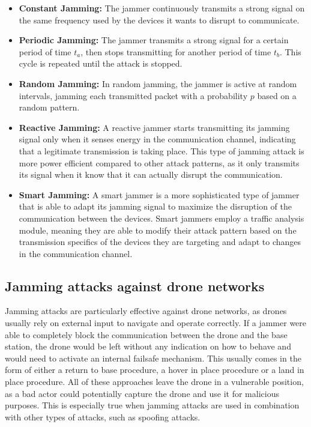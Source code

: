 \documentclass[futureinternet,article,submit,pdftex,moreauthors]{Definitions/mdpi}
\begin{document}
\begin{itemize}
    \item \textbf{Constant Jamming:} The jammer continuously transmits a strong signal on the same frequency used by the devices it wants to disrupt to communicate. 
    \item \textbf{Periodic Jamming:} The jammer transmits a strong signal for a certain period of time \(t_a\), then stops transmitting for another period of time \(t_b\). This cycle is repeated until the attack is stopped.
    \item \textbf{Random Jamming:} In random jamming, the jammer is active at random intervals, jamming each transmitted packet with a probability 
    \(p\) based on a random pattern\cite{VANETsAI-Lyamin}. 
    \item \textbf{Reactive Jamming:} A reactive jammer starts transmitting its jamming signal only when it senses energy in the communication channel, 
    indicating that a legitimate transmission is taking place. This type of jamming attack is more power efficient compared to other 
    attack patterns, as it only transmits its signal when it know that it can actually disrupt the communication\cite{MLMisbehavior5GBoualouache}.
    \item \textbf{Smart Jamming:} A smart jammer is a more sophisticated type of jammer that is able to adapt its jamming signal to 
    maximize the disruption of the communication between the devices. Smart jammers employ a traffic analysis module, meaning they are able to modify their attack pattern based on the 
    transmission specifics of the devices they are targeting and adapt to changes in the communication channel\cite{AntiJammingV2V-Feng}.
\end{itemize}


\subsection{Jamming attacks against drone networks}\label{JammingDroneNetworks}

Jamming attacks are particularly effective against drone networks, as drones usually rely on external input to navigate and operate correctly.
If a jammer were able to completely block the communication between the drone and the base station, the drone would be left without any indication on how to behave and would need to activate an internal failsafe mechanism. 
This usually comes in the form of either a return to base procedure, a hover in place procedure or a land in place procedure.
All of these approaches leave the drone in a vulnerable position, as a bad actor could potentially capture the drone and use it for malicious purposes.
This is especially true when jamming attacks are used in combination with other types of attacks, such as spoofing attacks. 
\end{document}
